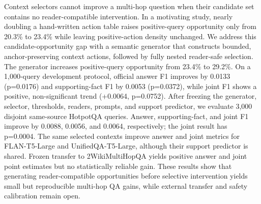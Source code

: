 Context selectors cannot improve a multi-hop question when their candidate set contains no reader-compatible intervention. In a motivating study, nearly doubling a hand-written action table raises positive-query opportunity only from 20.3\% to 23.4\% while leaving positive-action density unchanged. We address this candidate-opportunity gap with a semantic generator that constructs bounded, anchor-preserving context actions, followed by fully nested reader-safe selection. The generator increases positive-query opportunity from 23.4\% to 29.2\%. On a 1,000-query development protocol, official answer F1 improves by 0.0133 (p=0.0176) and supporting-fact F1 by 0.0053 (p=0.0372), while joint F1 shows a positive, non-significant trend (+0.0064, p=0.0752). After freezing the generator, selector, thresholds, readers, prompts, and support predictor, we evaluate 3,000 disjoint same-source HotpotQA queries. Answer, supporting-fact, and joint F1 improve by 0.0088, 0.0056, and 0.0064, respectively; the joint result has p=0.0004. The same selected contexts improve answer and joint metrics for FLAN-T5-Large and UnifiedQA-T5-Large, although their support predictor is shared. Frozen transfer to 2WikiMultiHopQA yields positive answer and joint point estimates but no statistically reliable gain. These results show that generating reader-compatible opportunities before selective intervention yields small but reproducible multi-hop QA gains, while external transfer and safety calibration remain open.
